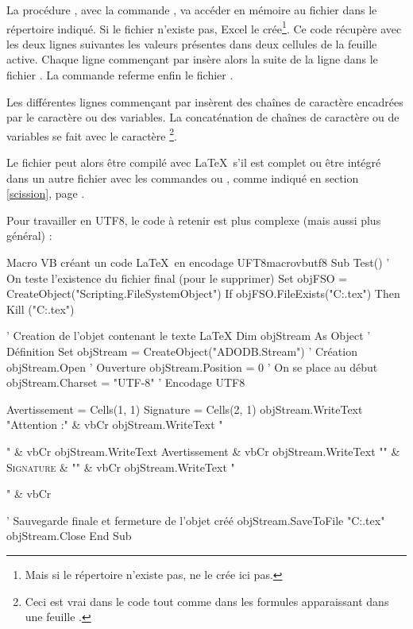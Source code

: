 La procédure , avec la commande , va accéder en mémoire au fichier  dans le répertoire indiqué. Si le fichier n'existe pas, Excel le crée\footnote{Mais si le répertoire n'existe pas,  ne le crée ici pas.}. Ce code récupère avec les deux lignes suivantes les valeurs présentes dans deux cellules de la feuille  active. Chaque ligne commençant par  insère alors la suite de la ligne dans le fichier . La commande  referme enfin le fichier .

Les différentes lignes commençant par  insèrent des chaînes de caractère encadrées par le caractère  ou des variables. La concaténation de chaînes de caractère ou de variables se fait avec le caractère \macron{\&}\footnote{Ceci est vrai dans le code  tout comme dans les formules apparaissant dans une feuille .}.

Le fichier  peut alors être compilé avec \LaTeX\ s'il est complet ou être intégré dans un autre fichier avec les commandes  ou , comme indiqué en section \ref{scission}, page \pageref{scission}.

Pour travailler en UTF8, le code à retenir est plus complexe (mais aussi plus général) :

\begin{codesimple}{Macro VB créant un code \LaTeX\ en encodage UFT8}{macrovbutf8}
Sub Test()
' On teste l'existence du fichier final (pour le supprimer)
Set objFSO = CreateObject("Scripting.FileSystemObject")
If objFSO.FileExists("C:\Test\liste.tex") Then Kill ("C:\Test\liste.tex")
    
' Creation de l'objet contenant le texte LaTeX
Dim objStream As Object                       ' Définition
Set objStream = CreateObject("ADODB.Stream")  ' Création
objStream.Open                                ' Ouverture
objStream.Position = 0                        ' On se place au début
objStream.Charset = "UTF-8"                   ' Encodage UTF8
    
Avertissement = Cells(1, 1)
Signature = Cells(2, 1)    
objStream.WriteText "Attention :" & vbCr
objStream.WriteText "\begin{center}" & vbCr
objStream.WriteText Avertissement & vbCr
objStream.WriteText "\textsc{" & Signature & "}" & vbCr
objStream.WriteText "\end{center}" & vbCr

' Sauvegarde finale et fermeture de l'objet créé
objStream.SaveToFile "C:\Test\liste.tex"
objStream.Close
End Sub
\end{codesimple}

